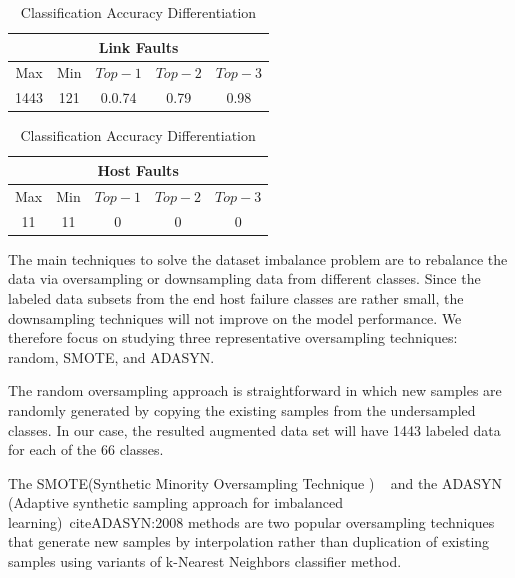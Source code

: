 \begin{table}[!ht]
\caption{Classification Accuracy Differentiation}
\label{tab:class}
\begin{center}
\begin{tabular}{ |c|c|c|c|c| } 
 \hline
  \multicolumn{5}{|c|}{Link Faults} \\
 \hline
 Max & Min & $Top-1$ & $Top-2$ & $Top-3$\\ 
 \hline
 1443 & 121  & 0.0.74 &  0.79 & 0.98 \\
 \hline
\end{tabular}

\begin{tabular}{ |c|c|c|c|c|} 
 \hline
\multicolumn{5}{|c|}{Host Faults} \\
 \hline
 Max & Min & $Top-1$ & $Top-2$ & $Top-3$ \\ 
 \hline
11 & 11  & 0 &  0 & 0\\
  \hline
\end{tabular}
\end{center}
\end{table}

The main techniques to solve the dataset imbalance problem are to rebalance the data via oversampling or downsampling data from different classes. Since the labeled data subsets from the end host failure classes are rather small, the downsampling techniques will not improve on the model performance. We therefore focus on studying three representative oversampling techniques: random, SMOTE, and ADASYN.

The random oversampling approach is straightforward in which new samples are randomly generated by copying the existing samples from the undersampled classes. In our case, the resulted augmented data set will have 1443 labeled data for each of the 66 classes. 

The SMOTE(Synthetic Minority Oversampling Technique ) ~\cite{smote:2002} and the ADASYN (Adaptive synthetic sampling approach for imbalanced learning)~cite{ADASYN:2008} methods are two popular oversampling techniques that 
generate new samples by interpolation rather than duplication of existing samples using variants of k-Nearest Neighbors classifier method.



